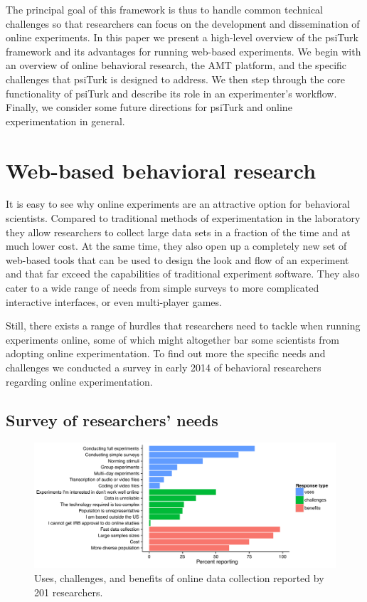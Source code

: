 \documentclass[twocolumn]{svjour3}          %
\begin{document}
The principal goal of this framework is thus to handle common technical challenges so that researchers can focus on the development and dissemination of online experiments.
In this paper we present a high-level overview of the psiTurk framework and its advantages for running web-based experiments.
We begin with an overview of online behavioral research, the AMT platform, and the specific challenges that psiTurk is designed to address.
We then step through the core functionality of psiTurk and describe its role in an experimenter's workflow.
Finally, we consider some future directions for psiTurk and online experimentation in general.


\section{Web-based behavioral research}
It is easy to see why online experiments are an attractive option for behavioral scientists.
Compared to traditional methods of experimentation in the laboratory
they allow researchers to collect large data sets in a fraction of the time and at much lower cost.
At the same time, they also open up a completely new set of web-based tools that  can be used to
design the look and flow of an experiment and that far exceed the capabilities
of traditional experiment software.
They also cater to a wide range of needs from simple surveys to more complicated interactive interfaces,
 or even multi-player games.

Still, there exists a range of hurdles that researchers need to tackle when running experiments
online, some of which might altogether bar some scientists from adopting online experimentation.
 To find out more the specific needs and challenges we conducted a survey in early 2014 of behavioral 
 researchers regarding online experimentation. 

\subsection{Survey of researchers' needs}

\begin{figure}[tp]
\centering
\includegraphics[width=\textwidth]{figures/combinedquestionsedited.pdf}
\caption{Uses, challenges, and benefits of online data collection reported by 201 researchers.}
\label{fig:survey}
\end{figure}
\end{document}

